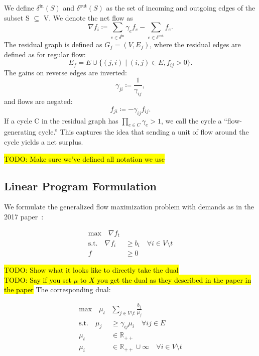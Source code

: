 \documentclass[11pt]{article}
\theoremstyle{definition}
\theoremstyle{definition}
\newcommand{\R}{\mathbb{R}}
\newcommand{\nfi}{\nabla f_i}
\newcommand{\din}{\delta^{\text{in}}}
\newcommand{\dout}{\delta^{\text{out}}}
\newcommand{\todo}[1]{\hl{TODO: #1}}
\begin{document}
		We define $\din(S)$ and $\dout(S)$ as the set of incoming and outgoing edges of the subset S $\subseteq$ V. We denote the net flow as
    \[ \nfi \coloneqq \sum_{e \in \din} \gamma_e f_e - \sum_{e \in \dout} f_e.\]
    The residual graph is defined as $G_f = (V, E_f)$, where the residual edges are defined
    as for regular flow:
    \[ E_f = E \cup \{ (j, i) \mid (i, j) \in E, f_{ij} > 0 \}. \]
    The gains on reverse edges are inverted:
    \[ \gamma_{ji} \coloneqq \frac{1}{\gamma_{ij}}, \]
    and flows are negated:
    \[ f_{ji} \coloneqq -\gamma_{ij}f_{ij}. \]
    If a cycle C in the residual graph has $\prod_{e \in C} \gamma_e > 1$,
    we call the cycle a ``flow-generating cycle.'' This captures the idea that sending
    a unit of flow around the cycle yields a net surplus.

		\todo{Make sure we've defined all notation we use}

    \subsection{Linear Program Formulation}
    \label{sec:lp}

	We formulate the generalized flow maximization problem with demands as in the 2017 paper~\cite{Olver2017}:
    
        \begin{align*}\tag{P}
        \text{max} \quad
        \nabla f_t& \\
        \text{s.t.} \quad
        \nabla f_i &\geq b_i \quad \forall i \in V \setminus t \\
        f &\geq 0
        \end{align*}        

\todo{Show what it looks like to directly take the dual}\\
\todo{Say if you set $\mu$ to $X$ you get the dual as they described in the paper in the paper}
\noindent The corresponding dual:
 
        \begin{align*}\tag{D}
        \text{max} \quad
        \mu_t &\sum_{j \in V \setminus t} \frac{b_j}{\mu_j}  \\
        \text{s.t.} \quad
        \mu_j &\geq \gamma_{ij}\mu_i \quad \forall ij \in E \\
        \mu_t &\in \R_{++} \\
        \mu_i &\in \R_{++} \cup \infty \quad \forall i \in V \setminus t
        \end{align*}  
        
\end{document}

